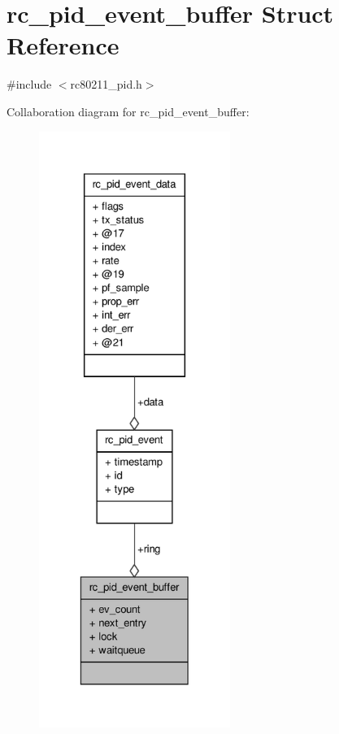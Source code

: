 \hypertarget{structrc__pid__event__buffer}{\section{rc\-\_\-pid\-\_\-event\-\_\-buffer Struct Reference}
\label{structrc__pid__event__buffer}
}


{\ttfamily \#include $<$rc80211\-\_\-pid.\-h$>$}



Collaboration diagram for rc\-\_\-pid\-\_\-event\-\_\-buffer\-:
\nopagebreak
\begin{figure}[H]
\begin{center}
\leavevmode
\includegraphics[height=550pt]{structrc__pid__event__buffer__coll__graph}
\end{center}
\end{figure}
